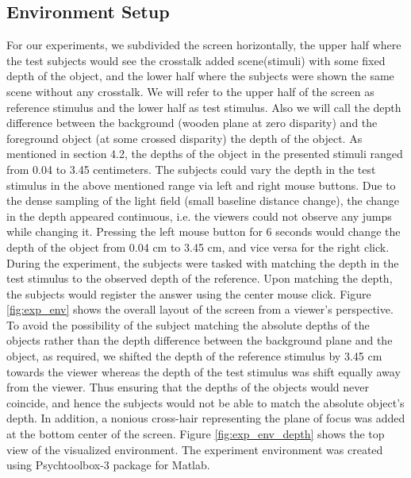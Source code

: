 \subsection{Environment Setup}
For our experiments, we subdivided the screen horizontally, the upper half where the test subjects would see the crosstalk added scene(stimuli) with some fixed depth of the object, and the lower half where the subjects were shown the same scene without any crosstalk. We will refer to the upper half of the screen as reference stimulus and the lower half as test stimulus. Also we will call the depth difference between the background (wooden plane at zero disparity) and the foreground object (at some crossed disparity) the depth of the object. As mentioned in section 4.2, the depths of the object in the presented stimuli ranged from 0.04 to 3.45 centimeters. The subjects could vary the depth in the test stimulus in the above mentioned range via left and right mouse buttons. Due to the dense sampling of the light field (small baseline distance change), the change in the depth appeared continuous, i.e. the viewers could not observe any jumps while changing it. Pressing the left mouse button for 6 seconds would change the depth of the object from 0.04 cm to 3.45 cm, and vice versa for the right click. During the experiment, the subjects were tasked with matching the depth in the test stimulus to the observed depth of the reference. Upon matching the depth, the subjects would register the answer using the center mouse click. Figure \ref{fig:exp_env} shows the overall layout of the screen from a viewer's perspective. To avoid the possibility of the subject matching the absolute depths of the objects rather than the depth difference between the background plane and the object, as required, we shifted the depth of the reference stimulus by 3.45 cm towards the viewer whereas the depth of the test stimulus was shift equally away from the viewer. Thus ensuring that the depths of the objects would never coincide, and hence the subjects would not be able to match the absolute object's depth. In addition, a nonious cross-hair representing the plane of focus was added at the bottom center of the screen. Figure \ref{fig:exp_env_depth} shows the top view of the visualized environment. The experiment environment was created using Psychtoolbox-3 package for Matlab.
